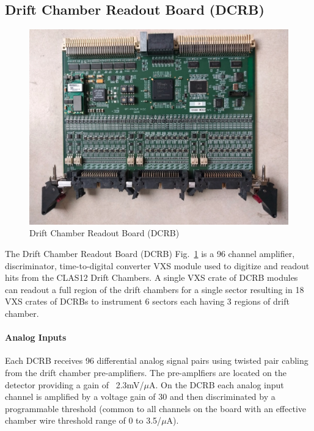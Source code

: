 \subsection{Drift Chamber Readout Board (DCRB)}

\begin{figure}[hbt]
	\centering
	\includegraphics[width=1.0\columnwidth,keepaspectratio]{img/dcrb_board.png}
	\caption{Drift Chamber Readout Board (DCRB)}
	\label{fig:dcrb_board}
\end{figure}

The Drift Chamber Readout Board (DCRB) Fig.~\ref{fig:dcrb_board} is a 96 channel amplifier, discriminator, time-to-digital converter VXS module used to digitize and readout hits from the CLAS12 Drift Chambers. A single VXS crate of DCRB modules can readout a full region of the drift chambers for a single sector resulting in 18 VXS crates of DCRBs to instrument 6 sectors each having 3 regions of drift chamber.

\paragraph{Analog Inputs}
Each DCRB receives 96 differential analog signal pairs using twisted pair cabling from the drift chamber pre-amplifiers. The pre-amplfiers are located on the detector providing a gain of ~2.3mV/$\mu$A. On the DCRB each analog input channel is amplified by a voltage gain of 30 and then discriminated by a programmable threshold (common to all channels on the board with an effective chamber wire threshold range of 0 to 3.5/$\mu$A).

